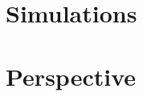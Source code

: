 \documentclass[10pt]{beamer}
\begin{document}
\section{Simulations}



\section{Perspective}





\end{document}
